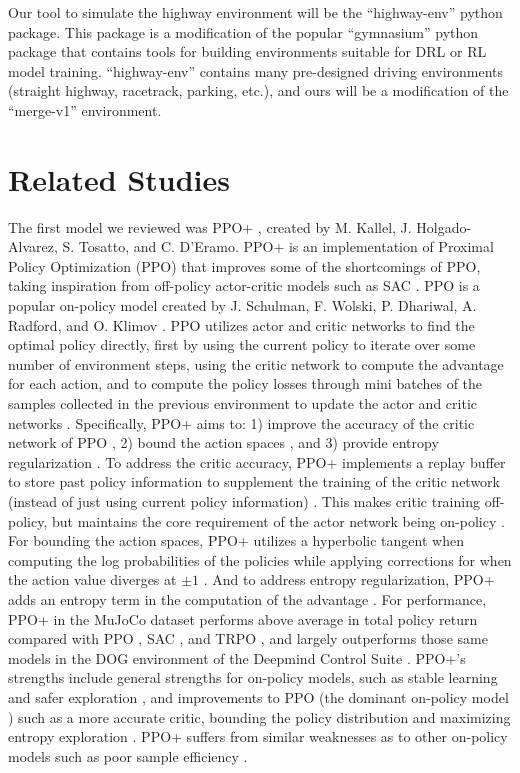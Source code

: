 \documentclass[conference]{IEEEtran}
\begin{document}
Our tool to simulate the highway environment will be the ``highway-env'' python package. This package is a 
modification of the popular ``gymnasium'' python package that contains tools for building environments suitable
for DRL or RL model training. ``highway-env'' contains many pre-designed driving environments (straight highway, 
racetrack, parking, etc.), and ours will be a modification of the ``merge-v1'' environment. 

\section{Related Studies}
The first model we reviewed was PPO+ \cite{b1}, created by M. Kallel, J. Holgado-Alvarez, S. Tosatto,
and C. D'Eramo. PPO+ is an implementation of Proximal Policy Optimization (PPO) \cite{b2} that improves 
some of the shortcomings of PPO, taking inspiration from off-policy actor-critic models such as 
SAC \cite{b3}. PPO is a popular \cite{b1} on-policy model created by J. Schulman, F. Wolski, P. Dhariwal, A. Radford, 
and O. Klimov \cite{b2}. PPO utilizes actor and critic networks to find the optimal policy directly, first by 
using the current policy to iterate over some number of environment steps, using the critic network to 
compute the advantage for each action, and to compute the policy losses through mini batches of the 
samples collected in the previous environment to update the actor and critic networks \cite{b2}. 
Specifically, PPO+ aims to: 1) improve the accuracy of the critic network of PPO \cite{b1}, 2) bound the action spaces \cite{b1}, 
and 3) provide entropy regularization \cite{b1}. To address the critic accuracy, PPO+ implements a replay buffer 
to store past policy information to supplement the training of the critic network (instead of just using current policy information) \cite{b1}.
This makes critic training off-policy, but maintains the core requirement of the actor network being on-policy \cite{b1}. 
For bounding the action spaces, PPO+ utilizes a hyperbolic tangent when computing the log 
probabilities of the policies while applying corrections for when the action value diverges at $\pm 1$ \cite{b1}. 
And to address entropy regularization, PPO+ adds an entropy term in the computation of the advantage \cite{b1}. 
For performance, PPO+ in the MuJoCo dataset performs above average \cite{b1} in total policy return compared with PPO \cite{b2}, SAC \cite{b3}, and TRPO \cite{b4}, 
and largely outperforms those same models in the DOG environment of the Deepmind Control Suite \cite{b1}. 
PPO+'s strengths include general strengths for on-policy models, such as stable learning and safer exploration \cite{b1}, 
and improvements to PPO (the dominant on-policy model \cite{b1}) such as a more accurate critic, bounding the policy 
distribution and maximizing entropy exploration \cite{b1}. 
PPO+ suffers from similar weaknesses as to other on-policy models such as poor sample efficiency \cite{b1}. 
\end{document}
